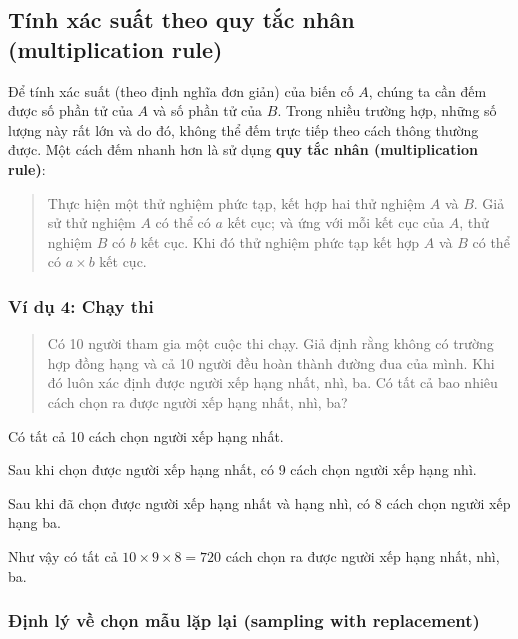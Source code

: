 \documentclass[
]{book}
\begin{document}
\hypertarget{tuxednh-xuxe1c-suux1ea5t-theo-quy-tux1eafc-nhuxe2n-multiplication-rule}{%
\subsection{Tính xác suất theo quy tắc nhân (multiplication rule)}\label{tuxednh-xuxe1c-suux1ea5t-theo-quy-tux1eafc-nhuxe2n-multiplication-rule}}

Để tính xác suất (theo định nghĩa đơn giản) của biến cố \(A\), chúng ta cần đếm được số phần tử của \(A\) và số phần tử của \(B\). Trong nhiều trường hợp, những số lượng này rất lớn và do đó, không thể đếm trực tiếp theo cách thông thường được. Một cách đếm nhanh hơn là sử dụng \textbf{quy tắc nhân (multiplication rule)}:

\begin{quote}
Thực hiện một thử nghiệm phức tạp, kết hợp hai thử nghiệm \(A\) và \(B\). Giả sử thử nghiệm \(A\) có thể có \(a\) kết cục; và ứng với mỗi kết cục của \(A\), thử nghiệm \(B\) có \(b\) kết cục. Khi đó thử nghiệm phức tạp kết hợp \(A\) và \(B\) có thể có \(a \times b\) kết cục.
\end{quote}

\hypertarget{vuxed-dux1ee5-4-chux1ea1y-thi}{%
\subsubsection{Ví dụ 4: Chạy thi}\label{vuxed-dux1ee5-4-chux1ea1y-thi}}

\begin{quote}
Có 10 người tham gia một cuộc thi chạy. Giả định rằng không có trường hợp đồng hạng và cả 10 người đều hoàn thành đường đua của mình. Khi đó luôn xác định được người xếp hạng nhất, nhì, ba. Có tất cả bao nhiêu cách chọn ra được người xếp hạng nhất, nhì, ba?
\end{quote}

Có tất cả 10 cách chọn người xếp hạng nhất.

Sau khi chọn được người xếp hạng nhất, có 9 cách chọn người xếp hạng nhì.

Sau khi đã chọn được người xếp hạng nhất và hạng nhì, có 8 cách chọn người xếp hạng ba.

Như vậy có tất cả \(10 \times 9 \times 8 = 720\) cách chọn ra được người xếp hạng nhất, nhì, ba.

\hypertarget{ux111ux1ecbnh-luxfd-vux1ec1-chux1ecdn-mux1eabu-lux1eb7p-lux1ea1i-sampling-with-replacement}{%
\subsubsection{Định lý về chọn mẫu lặp lại (sampling with replacement)}\label{ux111ux1ecbnh-luxfd-vux1ec1-chux1ecdn-mux1eabu-lux1eb7p-lux1ea1i-sampling-with-replacement}}
\end{document}
